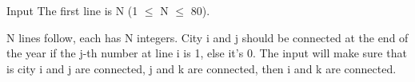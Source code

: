 Input
The first line is N (1  $\le$  N  $\le$  80).  

   N lines follow, each has N integers. City i and j should be connected at the end of the year if the j-th number at line i is 1, else it's 0. The input will make sure that is city i and j are connected, j and k are connected, then i and k are connected.